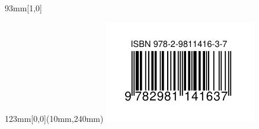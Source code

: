\documentclass[letterpaper,11pt]{memoir}
\begin{document}
\begin{textblock*}{93mm}[1,0]
\end{textblock*}

\begin{textblock*}{123mm}[0,0](10mm,240mm)
  \includegraphics[keepaspectratio=true]{codebarre} \\
\end{textblock*}
\end{document}
